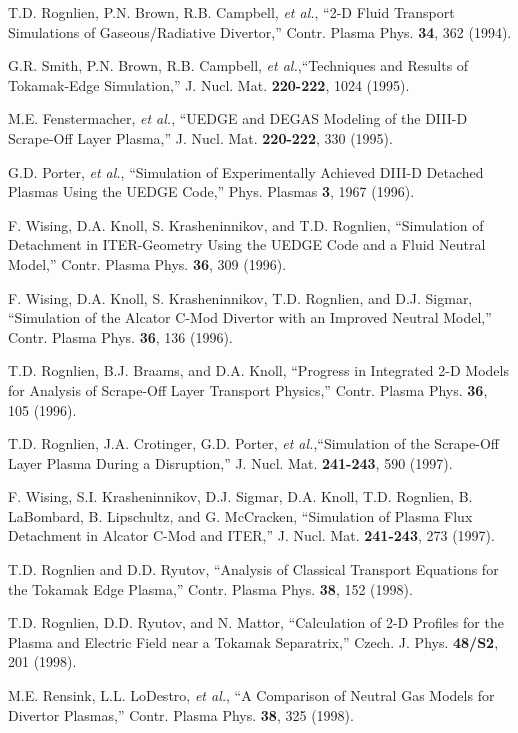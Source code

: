 \documentclass [12pt]{article}
\begin{document}
\begin{thebibliography}{99}
 T.D. Rognlien, P.N. Brown, R.B. Campbell, {\it et al.}, ``2-D
  Fluid Transport Simulations of Gaseous/Radiative Divertor,'' Contr. Plasma
  Phys.  {\bf 34}, 362 (1994).
  
 G.R. Smith, P.N. Brown, R.B. Campbell, {\it et al.},``Techniques
  and Results of Tokamak-Edge Simulation,'' J. Nucl. Mat. {\bf 220-222}, 1024
  (1995).
  
 M.E. Fenstermacher, {\it et al.}, ``UEDGE and DEGAS Modeling of
  the DIII-D Scrape-Off Layer Plasma,'' J. Nucl. Mat. {\bf 220-222}, 330
  (1995).
  
 G.D. Porter, {\it et al.}, ``Simulation of Experimentally
  Achieved DIII-D Detached Plasmas Using the UEDGE Code,'' Phys. Plasmas {\bf
    3}, 1967 (1996).
  
 F. Wising, D.A. Knoll, S. Krasheninnikov, and T.D. Rognlien,
  ``Simulation of Detachment in ITER-Geometry Using the UEDGE Code and a Fluid
  Neutral Model,'' Contr. Plasma Phys. {\bf  36}, 309 (1996).
  
 F. Wising, D.A. Knoll, S. Krasheninnikov, T.D. Rognlien, and
  D.J. Sigmar, ``Simulation of the Alcator C-Mod Divertor with an Improved
  Neutral Model,'' Contr. Plasma Phys. {\bf  36}, 136 (1996).
  
 T.D. Rognlien, B.J. Braams, and D.A. Knoll, ``Progress in
  Integrated 2-D Models for Analysis of Scrape-Off Layer Transport Physics,''
  Contr. Plasma Phys. {\bf  36}, 105 (1996).
  
 T.D. Rognlien, J.A. Crotinger, G.D. Porter, {\it et
    al.},``Simulation of the Scrape-Off Layer Plasma During a Disruption,'' J.
  Nucl. Mat. {\bf 241-243}, 590 (1997).

 F. Wising, S.I. Krasheninnikov, D.J. Sigmar, D.A. Knoll, T.D.
  Rognlien, B. LaBombard, B. Lipschultz, and G. McCracken, ``Simulation of
  Plasma Flux Detachment in Alcator C-Mod and ITER,'' J. Nucl. Mat. {\bf
    241-243}, 273 (1997).
  
 T.D. Rognlien and D.D. Ryutov, ``Analysis of Classical Transport
  Equations for the Tokamak Edge Plasma,'' Contr. Plasma Phys. {\bf  38}, 152
  (1998).
  
 T.D. Rognlien, D.D. Ryutov, and N. Mattor, ``Calculation of 2-D
  Profiles for the Plasma and Electric Field near a Tokamak Separatrix,''
  Czech. J. Phys. {\bf  48/S2}, 201 (1998).
  
 M.E. Rensink, L.L. LoDestro, {\it et al.}, ``A Comparison of
  Neutral Gas Models for Divertor Plasmas,'' Contr. Plasma Phys. {\bf 38}, 325
  (1998).
  

\end{thebibliography}
\end{document}
